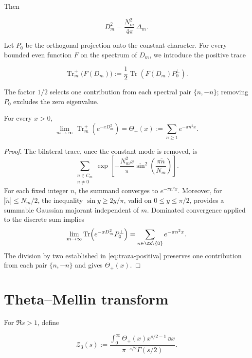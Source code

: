 Then

\begin{equation}
 D_m^2=\frac{N_m^2}{4\pi}\,\Delta_m.
 \label{eq:Dm-laplaciano}
\end{equation}

Let $P_0$ be the orthogonal projection onto the constant character. For every
bounded even function $F$ on the spectrum of $D_m$, we introduce the positive
trace

\begin{equation}
 \operatorname{Tr}^{+}_m\!\bigl(F(D_m)\bigr)
 :=\frac12\operatorname{Tr}
 \!\left(F(D_m)P_0^{\perp}\right).
 \label{eq:traza-positiva}
\end{equation}

The factor $1/2$ selects one contribution from each spectral pair
$\{n,-n\}$; removing $P_0$ excludes the zero eigenvalue.

\begin{theorem}
\label{thm:limite-theta-triadico}
For every $x>0$,
\[
 \lim_{m\to\infty}
 \operatorname{Tr}^{+}_m\!\left(e^{-xD_m^2}\right)
 =\Theta_+(x)
 :=\sum_{n\geq1}e^{-\pi n^2x}.
\]
\end{theorem}

\begin{proof}
The bilateral trace, once the constant mode is removed, is
\[
 \sum_{\substack{n\in C_m\\n\neq0}}
 \exp\!\left[
 -\frac{N_m^2x}{\pi}
 \sin^2\!\left(\frac{\pi\widetilde n}{N_m}\right)
 \right].
\]
For each fixed integer $n$, the summand converges to $e^{-\pi n^2x}$. Moreover,
for $|\widetilde n|\leq N_m/2$, the inequality
$\sin y\geq 2y/\pi$, valid on $0\leq y\leq\pi/2$, provides a
summable Gaussian majorant independent of $m$. Dominated
convergence applied to the discrete sum implies
\[
 \lim_{m\to\infty}
 \operatorname{Tr}\!\left(e^{-xD_m^2}P_0^\perp\right)
 =\sum_{n\in\ZZ\setminus\{0\}}e^{-\pi n^2x}.
\]
The division by two established in \eqref{eq:traza-positiva} preserves one
contribution from each pair $\{n,-n\}$ and gives $\Theta_+(x)$.
\end{proof}

\section{Theta--Mellin transform}

For $\Re s>1$, define

\begin{equation}
 \mathcal Z_{3}(s)
 :=
 \frac{\displaystyle
 \int_0^\infty\Theta_+(x)x^{s/2-1}\,\dd x}
 {\pi^{-s/2}\Gamma(s/2)}.
 \label{eq:funcional-theta-mellin}
\end{equation}

